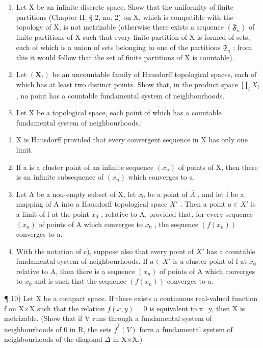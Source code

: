 \begin{enumerate}
\def\labelenumi{\arabic{enumi})}
\setcounter{enumi}{6}
\item
  Let X be an infinite discrete space. Show that the uniformity of finite partitions (Chapter II, § 2, no. 2) on X, which is compatible with the topology of X, is not metrizable (otherwise there exists a sequence \((\mathfrak{F}_n)\) of finite partitions of X such that every finite partition of X is formed of sets, each of which is a union of sets belonging to one of the partitions \(\mathfrak{F}_n\) ; from this it would follow that the set of finite partitions of X is countable).
\item
  Let \((\mathbf{X}_{t})\) be an uncountable family of Hausdorff topological spaces, each of which has at least two distinct points. Show that, in the product space \(\prod_{i} X_{i}\) , no point has a countable fundamental system of neighbourhoods.
\item
  Let X be a topological space, each point of which has a countable fundamental system of neighbourhoods.
\end{enumerate}

\begin{enumerate}
\def\labelenumi{\alph{enumi})}
\item
  X is Hausdorff provided that every convergent sequence in X has only one limit.
\item
  If a is a cluster point of an infinite sequence \((x_{n})\) of points of X, then there is an infinite subsequence of \((x_{n})\) which converges to a.
\item
  Let A be a non-empty subset of X, let \(x_{0}\) be a point of \(\overline{A}\) , and let f be a mapping of A into a Hausdorff topological space \(X'\) . Then a point \(a \in X'\) is a limit of f at the point \(x_{0}\) , relative to A, provided that, for every sequence \((x_{n})\) of points of A which converges to \(x_{0}\) , the sequence \((f(x_{n}))\) converges to a.
\item
  With the notation of c), suppose also that every point of \(X'\) has a countable fundamental system of neighbourhoods. If \(a \in X'\) is a cluster point of f at \(x_{0}\) relative to A, then there is a sequence \((x_{n})\) of points of A which converges to \(x_{0}\) and is such that the sequence \((f(x_{n}))\) converges to a.
\end{enumerate}

¶ 10) Let X be a compact space. If there exists a continuous real-valued function f on X×X such that the relation \(f(x,y)=0\) is equivalent to x=y, then X is metrizable. (Show that if V runs through a fundamental system of neighbourhoods of 0 in R, the sets \(\overline{f}^{1}(V)\) form a fundamental system of neighbourhoods of the diagonal \(\Delta\) in X×X.)

